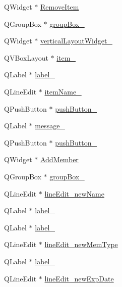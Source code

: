 \begin{DoxyCompactItemize}
\item 
Q\+Widget $\ast$ \hyperlink{class_ui___main_window_acda54e920f7befd6c5f8a32578050a51}{Remove\+Item}
\item 
Q\+Group\+Box $\ast$ \hyperlink{class_ui___main_window_af332b1696f1ba690fbc576d4784de110}{group\+Box\+\_}
\item 
Q\+Widget $\ast$ \hyperlink{class_ui___main_window_acfaf6d66c957965550714c6b9bd0edc0}{vertical\+Layout\+Widget\+\_}
\item 
Q\+V\+Box\+Layout $\ast$ \hyperlink{class_ui___main_window_a5a7e85e145a83d09df4de1400d204034}{item\+\_}
\item 
Q\+Label $\ast$ \hyperlink{class_ui___main_window_a0376fd90247280e7c7957cc70628708c}{label\+\_}
\item 
Q\+Line\+Edit $\ast$ \hyperlink{class_ui___main_window_a6de8baf4b867d345f5741df0baa3810b}{item\+Name\+\_}
\item 
Q\+Push\+Button $\ast$ \hyperlink{class_ui___main_window_a59a7d8124bce933d63f53f2153d447b4}{push\+Button\+\_}
\item 
Q\+Label $\ast$ \hyperlink{class_ui___main_window_aef8108718448585fe515646a5a0de025}{message\+\_}
\item 
Q\+Push\+Button $\ast$ \hyperlink{class_ui___main_window_a3f20112708231220f3a4f567802130c5}{push\+Button\+\_}
\item 
Q\+Widget $\ast$ \hyperlink{class_ui___main_window_a2c221c2b57be2a2165a763acefd74c38}{Add\+Member}
\item 
Q\+Group\+Box $\ast$ \hyperlink{class_ui___main_window_a545ccbfe884b113534cb53849efc967a}{group\+Box\+\_}
\item 
Q\+Line\+Edit $\ast$ \hyperlink{class_ui___main_window_ad13833afeb6a3a605d14c1ea35f84c52}{line\+Edit\+\_\+new\+Name}
\item 
Q\+Label $\ast$ \hyperlink{class_ui___main_window_a78c7e10730b43c6700cd7216911ed76a}{label\+\_}
\item 
Q\+Label $\ast$ \hyperlink{class_ui___main_window_ad6bab8fb8903b8f41afea1218ee52695}{label\+\_}
\item 
Q\+Line\+Edit $\ast$ \hyperlink{class_ui___main_window_acd0ed8d995f08a2a2e3a9eb718d87079}{line\+Edit\+\_\+new\+Mem\+Type}
\item 
Q\+Label $\ast$ \hyperlink{class_ui___main_window_a663f728e6244926a795c6e6892673b1d}{label\+\_}
\item 
Q\+Line\+Edit $\ast$ \hyperlink{class_ui___main_window_add2a433bf7e10daa3fb34567de905b4c}{line\+Edit\+\_\+new\+Exp\+Date}

\end{DoxyCompactItemize}
